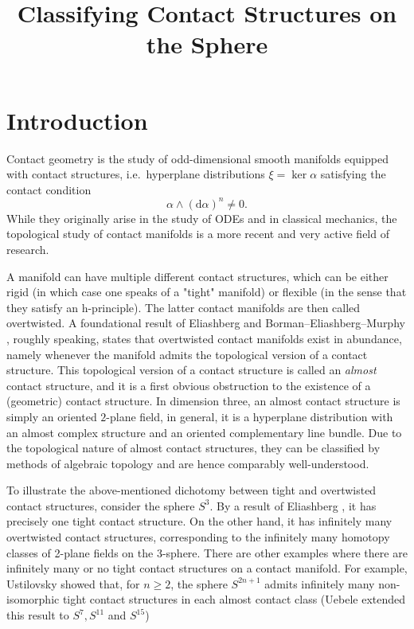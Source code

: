 \documentclass[a4paper]{amsart}
\renewcommand*{\d}{\mathrm{d}}
\begin{document}
\title{Classifying Contact Structures on the Sphere}
\address{}
\date{}

\maketitle
\section*{Introduction}
Contact geometry is the study of odd-dimensional smooth manifolds equipped with contact structures, i.e.\ hyperplane distributions $\xi = \ker \alpha$ satisfying the contact condition
\[
    \alpha \wedge (\d \alpha)^n \neq 0.
\]
While they originally arise in the study of ODEs and in classical mechanics, the topological study of contact manifolds is a more recent and very active field of research.

A manifold can have multiple different contact structures, which can be either rigid (in which case one speaks of a "tight" manifold) or flexible (in the sense that they satisfy an h-principle). The latter contact manifolds are then called overtwisted. A foundational result of Eliashberg \cite{Eliashberg89} and Borman--Eliashberg--Murphy \cite{BEM15}, roughly speaking, states that overtwisted contact manifolds exist in abundance, namely whenever the manifold admits the topological version of a contact structure.
This topological version of a contact structure is called an \emph{almost} contact structure, and it is a first obvious obstruction to the existence of a (geometric) contact structure. 
In dimension three, an almost contact structure is simply an oriented $2$-plane field,
in general, it is a hyperplane distribution with an almost complex structure
and an oriented complementary line bundle.
Due to the topological nature of almost contact structures, they can be classified
by methods of algebraic topology and are hence comparably well-understood.

To illustrate the above-mentioned dichotomy between tight and overtwisted contact structures, consider the sphere $S^3$. By a result of Eliashberg \cite{Eliashberg92}, it has precisely one tight contact structure. On the other hand, it has infinitely many overtwisted contact structures, corresponding to the infinitely many homotopy classes of 2-plane fields on the 3-sphere. There are other examples where there are infinitely many or no tight contact structures on a contact manifold.
For example, Ustilovsky \cite{Ustilovsky99} showed that, for $n \geq 2$, the sphere 
$S^{2n+1}$ admits infinitely many non-isomorphic tight contact structures in each almost 
contact class (Uebele \cite{Uebele16} extended this result to $S^7, S^{11}$ and $S^{15}$)
\end{document}
